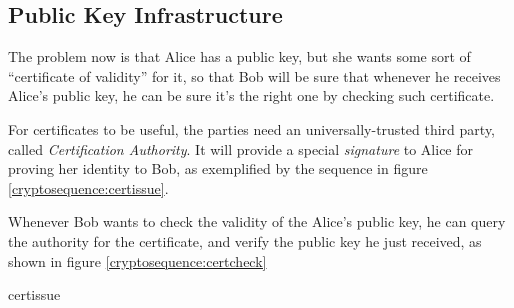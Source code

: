 \subsection{Public Key Infrastructure}

The problem now is that Alice has a public key, but she wants some sort of ``certificate of validity'' for it, so that Bob will be sure that whenever he receives Alice's public key, he can be sure it's the right one by checking such certificate.

For certificates to be useful, the parties need an universally-trusted third party, called \textit{Certification Authority}. It will provide a special \textit{signature} to Alice for proving her identity to Bob, as exemplified by the sequence in figure \ref{cryptosequence:certissue}.

Whenever Bob wants to check the validity of the Alice's public key, he can query the authority for the certificate, and verify the public key he just received, as shown in figure \ref{cryptosequence:certcheck}

\begin{cryptosequence}
    {certissue}
    {}



    \cseqdelay

    
    \cseqdelay

    
\end{cryptosequence}

